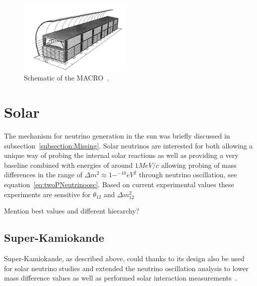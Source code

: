 \begin{figure}[h!]
\centering
  \centering
\includegraphics[width=0.49\textwidth]{figures/MACRO.jpeg}
\vspace{2mm}
\caption{Schematic of the MACRO~\cite{61MACRO}.}
\label{fig:Kam3}
\end{figure}

\section{Solar}
The mechanism for neutrino generation in the sun was briefly discussed in subsection~\ref{subsection:Missing}.
Solar neutrinos are interested for both allowing a unique way of probing the internal solar reactions as well as providing a very baseline combined with energies of around $1 MeV/c$ allowing probing of mass differences in the range of $\Delta m^2 \approx 1-^{-10} eV^2$ through neutrino oscillation, see equation~\ref{eq:twoPNeutrinoosc}. Based on current experimental values these experiments are sensitive for $\theta_{12}$ and $\Delta m_{12}^2 $

Mention best values and different hierarchy?

\subsection{Super-Kamiokande}

Super-Kamiokande, as described above, could thanks to its design also be used for solar neutrino studies and extended the neutrino oscillation analysis to lower mass difference values as well as performed solar interaction measurements~\cite{64SuperK}.

